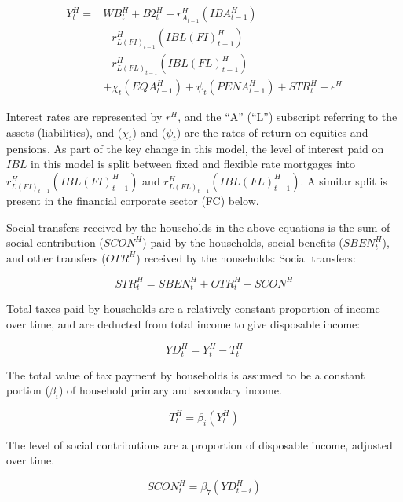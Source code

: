 \documentclass[
]{book}
\begin{document}
\begin{equation}
\begin{split}
Y^H_t = & WB^H_t + B2^H_{t} + r^H_{A_{t-1}}(IBA^H_{t-1})\\
        & - r^H_{L(FI)_{t-1}}(IBL(FI)^H_{t-1})\\
        & - r^H_{L(FL)_{t-1}}(IBL(FL)^H_{t-1})\\
        & + \chi _t(EQA^H_{t-1}) + \psi _t(PENA^H_{t-1}) + STR^H_t + \epsilon ^H
\label{eq:Yht}
\end{split}
\end{equation}

Interest rates are represented by \(r^H\), and the ``A'' (``L'') subscript referring to the assets (liabilities), and (\(\chi _t\)) and (\(\psi _t\)) are the rates of return on equities and pensions. As part of the key change in this model, the level of interest paid on \(IBL\) in this model is split between fixed and flexible rate mortgages into \(r^H_{L(FI)_{t-1}}(IBL(FI)^H_{t-1})\) and \(r^H_{L(FL)_{t-1}}(IBL(FL)^H_{t-1})\). A similar split is present in the financial corporate sector (FC) below.

Social transfers received by the households in the above equations is the sum of social contribution (\(SCON^H\)) paid by the households, social benefits (\(SBEN^H_t\)), and other transfers (\(OTR^H\)) received by the households:
Social transfers:

\begin{equation}
STR^H_t = SBEN^H_t + OTR^H_t - SCON^H
\end{equation}

Total taxes paid by households are a relatively constant proportion of income over time,
and are deducted from total income to give disposable income:

\begin{equation}
YD^H_t = Y^H_t - T^H_t
\end{equation}

The total value of tax payment by households is assumed to be a constant portion (\(\beta _i\))
of household primary and secondary income.

\begin{equation}
T^H_t = \beta _i (Y^H_t)
\end{equation}

The level of social contributions are a proportion of disposable income, adjusted over time.

\begin{equation}
SCON^H_t = \beta _7(YD^H_{t-i})
\end{equation}
\end{document}
